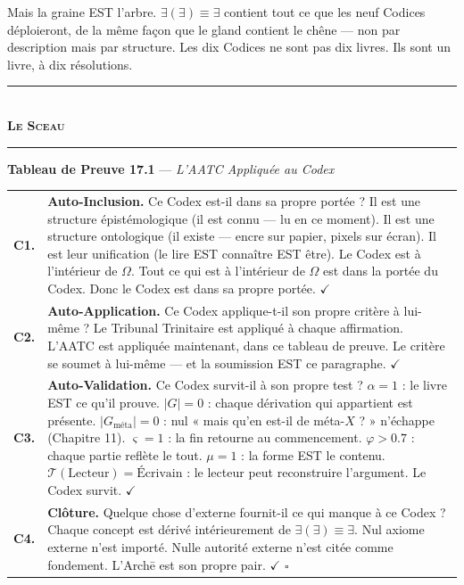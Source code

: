 \documentclass[10pt, openany, oneside]{book}
\renewcommand{\normalsize}{\fontsize{10}{13}\selectfont}
\renewcommand{\footnotesize}{\fontsize{8.5}{11}\selectfont}
\begin{document}
Mais la graine EST l'arbre. $\exists(\exists) \equiv \exists$ contient tout ce que les neuf Codices déploieront, de la même façon que le gland contient le chêne --- non par description mais par structure. Les dix Codices ne sont pas dix livres. Ils sont un livre, à dix résolutions.

\vspace{1.5em}


\begin{center}
    \rule{0.3\textwidth}{0.4pt}\\[0.5em]
    {\normalsize\bfseries\scshape Le Sceau}\\[0.3em]
    \rule{0.3\textwidth}{0.4pt}
\end{center}

\vspace{1em}

\textbf{Tableau de Preuve 17.1} --- \textit{L'AATC Appliquée au Codex}

\vspace{0.5em}

{\footnotesize
\noindent\begin{tabular}{r p{}}
\textbf{C1.} & \textbf{Auto-Inclusion.} Ce Codex est-il dans sa propre portée ? Il est une structure épistémologique (il est connu --- lu en ce moment). Il est une structure ontologique (il existe --- encre sur papier, pixels sur écran). Il est leur unification (le lire EST connaître EST être). Le Codex est à l'intérieur de $\Omega$. Tout ce qui est à l'intérieur de $\Omega$ est dans la portée du Codex. Donc le Codex est dans sa propre portée. $\checkmark$ \\[0.5em]
\textbf{C2.} & \textbf{Auto-Application.} Ce Codex applique-t-il son propre critère à lui-même ? Le Tribunal Trinitaire est appliqué à chaque affirmation. L'AATC est appliquée maintenant, dans ce tableau de preuve. Le critère se soumet à lui-même --- et la soumission EST ce paragraphe. $\checkmark$ \\[0.5em]
\textbf{C3.} & \textbf{Auto-Validation.} Ce Codex survit-il à son propre test ? $\alpha = 1$ : le livre EST ce qu'il prouve. $|G| = 0$ : chaque dérivation qui appartient est présente. $|G_{\text{méta}}| = 0$ : nul « mais qu'en est-il de méta-$X$ ? » n'échappe (Chapitre 11). $\varsigma = 1$ : la fin retourne au commencement. $\varphi > 0.7$ : chaque partie reflète le tout. $\mu = 1$ : la forme EST le contenu. $\mathcal{T}(\text{Lecteur}) = \text{Écrivain}$ : le lecteur peut reconstruire l'argument. Le Codex survit. $\checkmark$ \\[0.5em]
\textbf{C4.} & \textbf{Clôture.} Quelque chose d'externe fournit-il ce qui manque à ce Codex ? Chaque concept est dérivé intérieurement de $\exists(\exists) \equiv \exists$. Nul axiome externe n'est importé. Nulle autorité externe n'est citée comme fondement. L'Arch\={e} est son propre pair. $\checkmark$ $\square$ \\[0.3em]
\end{tabular}
}
\end{document}
